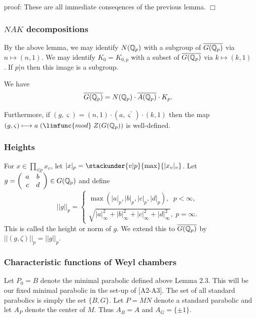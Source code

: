 proof: These are all immediate conseqences of the previous lemma. $\Box $

\subsubsection{$NAK$ decompositions}

By the above lemma, we may identify $N({\Bbb{Q}}_p)$ with a subgroup of $%
\overline{G({\Bbb{Q}}_p)}$ via $n\longmapsto (n,1)$. We may identify $%
K_0=K_{0,p}$ with a subset of $\overline{G({\Bbb{Q}}_p)}$ via $k\longmapsto
(k,1)$. If $p|n$ then this image is a subgroup.

\begin{lemma}
We have 
\[
\overline{G({\Bbb{Q}}_p)}=N({\Bbb{Q}}_p)\cdot \overline{A({\Bbb{Q}}_p)}\cdot K_p.
\]

Furthermore, if $(g,\varsigma )=(n,1)\cdot (a,\varsigma ^{\prime })\cdot
(k,1)$ then the map $(g,\varsigma )\longmapsto a\;(\limfunc{mod}\;Z(G({\Bbb{Q}}%
_p))$ is well-defined.
\end{lemma}

\subsubsection{Heights}

For $x\in \prod_{v|p}x_v$, let $|x|_p=\stackunder{v|p}{\max }\{|x_v|_v\}$.
Let $g=\left( 
\begin{array}{cc}
a & b \\ 
c & d
\end{array}
\right) \in G({\Bbb{Q}}_p)$ and define 
\[
||g||_p=\left\{ 
\begin{array}{c}
\max (|a|_p,|b|_p,|c|_p,|d|_p),\;\;p<\infty , \\ 
\sqrt{|a|_\infty ^2+|b|_\infty ^2+|c|_\infty ^2+|d|_\infty ^2},\;p=\infty .
\end{array}
\right. 
\]
This is called the height or norm of $g$. We extend this to
$\overline{G({{\Bbb{Q}}}_p)}$ by $||(g,\zeta)||_p=||g||_p$.

\subsubsection{Characteristic functions of Weyl chambers}

Let $P_0=B$ denote the minimal parabolic defined above Lemma 2.3.
This will be our fixed
minimal parabolic in the set-up of [A2-A3]. The set of all standard
parabolics is simply the set $\{B,G\}$. Let $P=MN$ denote a standard
parabolic and let $A_P$ denote the center of $M$. Thus $A_B=A$ and
$A_G=\{\pm 1\}$.

